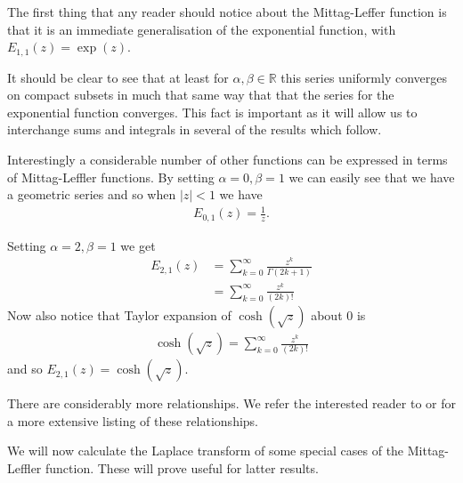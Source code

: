 The first thing that any reader should notice about the Mittag-Leffer function is that it is an immediate generalisation of the exponential function, with $ E_{1, 1}(z) = \exp(z) $. 

It should be clear to see that at least for $ \alpha, \beta \in \mathbb{R} $ this series uniformly converges on compact subsets in much that same way that that the series for the exponential function converges. This fact is important as it will allow us to interchange sums and integrals in several of the results which follow.

Interestingly a considerable number of other functions can be expressed in terms of Mittag-Leffler functions. By setting $ \alpha = 0, \beta = 1 $ we can easily see that we have a geometric series and so when $ |z| < 1 $ we have
\begin{align}
    E_{0,1}(z) = \frac{1}{z}.
\end{align}

Setting $ \alpha = 2, \beta = 1 $ we get
\begin{align}
    E_{2,1}(z) &= \sum_{k=0}^\infty \frac{z^k}{\Gamma(2k + 1)} \\
            &= \sum_{k=0}^\infty \frac{z^k}{(2k)!}
\end{align}
Now also notice that Taylor expansion of $ \cosh(\sqrt{z}) $ about 0 is
\begin{align}
    \cosh(\sqrt{z}) = \sum_{k=0}^\infty \frac{z^k}{(2k)!}
\end{align}
and so $ E_{2,1}(z) = \cosh(\sqrt{z}) $. 

There are considerably more relationships. We refer the interested reader to \cite{Podlubny1999} or \cite{Samko1993} for a more extensive listing of these relationships.

We will now calculate the Laplace transform of some special cases of the Mittag-Leffler function. These will prove useful for latter results. 

